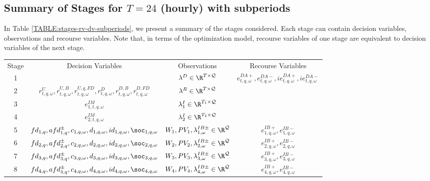 \subsection{\texorpdfstring{Summary of Stages for $T = 24$ (hourly) with subperiods}{Summary of Stages for T = 24 (hourly) with subperiods}}

In Table \ref{TABLE:stages-rv-dv-subperiods}, we present a summary of the stages considered. Each stage can contain decision variables, observations and recourse variables. Note that, in terms of the optimization model, recourse variables of one stage are equivalent to decision variables of the next stage.

\begin{table}[H]
\begin{tabular}{c c c c}
	Stage & Decision Variables & Observations & Recourse Variables \\
	1 & & $\lambda^D \in \R^{T\times \mathcal{Q}}$& $e^{DA+}_{t,q, \omega}, e^{DA-}_{t,q, \omega}, ie^{DA+}_{t,q, \omega}, ie^{DA-}_{t,q, \omega}$\\
	2 & $r^U_{t,q, \omega}, r^{U, B}_{t,q, \omega}, r^{U,q, FD}_{t,q, \omega}, r^{D}_{t,q, \omega}, r^{D, B}_{t,q, \omega}, r^{D, FD}_{t,q, \omega}$ & $\lambda^R \in \R^{T\times \mathcal{Q}}$& \\
	3 & $e^{IM}_{1, t, q,\omega}$& $\lambda^I_1 \in \R^{T_1 \times \mathcal{Q}}$&  \\
	4 & $e^{IM}_{2, t,q, \omega}$& $\lambda^I_2 \in \R^{T_2 \times \mathcal{Q}}$&  \\
	5 & $fd_{1,q}, afd^{\pm}_{1,q}, c_{1,q, \omega}, d_{1,q, \omega}, id_{1,q, \omega}, \soc_{1,q, \omega}$& $W_1, PV_1, \lambda^{IB\pm}_{1, \omega} \in \R^\mathcal{Q}$& $e^{IB+}_{1,q, \omega}, e^{IB-}_{1,q, \omega}$\\
	6 & $fd_{2,q}, afd^{\pm}_{2,q}, c_{2, q,\omega}, d_{2, q,\omega}, id_{2,q, \omega}, \soc_{2, q,\omega}$& $W_2, PV_2, \lambda^{IB\pm}_{2, \omega} \in \R^\mathcal{Q}$& $e^{IB+}_{2, q,\omega}, e^{IB-}_{2,q, \omega}$\\
	7& $fd_{3,q}, afd^{\pm}_{3,q}, c_{3,q, \omega}, d_{3,q, \omega}, id_{3,q, \omega}, \soc_{3, q,\omega}$& $W_3, PV_3, \lambda^{IB\pm}_{3, \omega} \in \R^\mathcal{Q}$& $e^{IB+}_{3,q, \omega}, e^{IB-}_{3, q,\omega}$\\
	8& $fd_{4,q}, afd^{\pm}_{4,q}, c_{4, q,\omega}, d_{4,q, \omega}, id_{4, q,\omega}, \soc_{4, q,\omega}$& $W_4, PV_4, \lambda^{IB\pm}_{4, \omega} \in \R^\mathcal{Q}$& $e^{IB+}_{4, q,\omega}, e^{IB-}_{4, q,\omega}$\\

\end{tabular}
\end{table}
